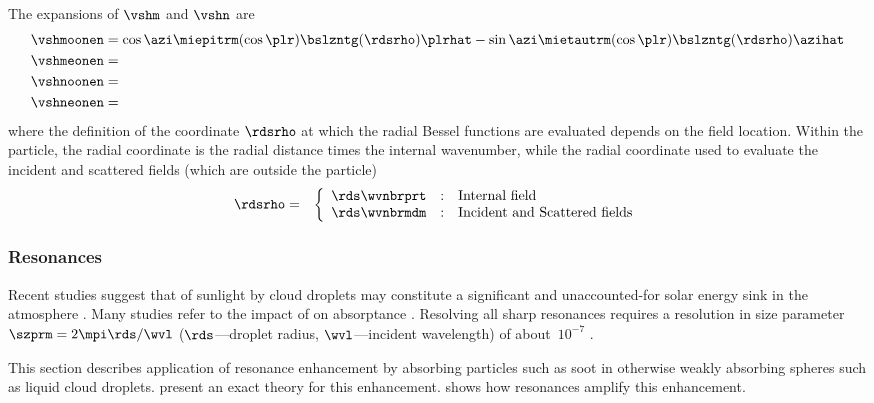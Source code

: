 \documentclass[12pt]{article}
\begin{document}
The  expansions of $\vshm$ and
$\vshn$ are
\begin{subequations}
\label{eqn:vsh_dfn}
\begin{align}
\label{eqn:vshmoonen_dfn}
\vshmoonen & = 
\cos \azi \miepitrm (\cos \plr) \bslzntg (\rdsrho) \plrhat -
\sin \azi \mietautrm (\cos \plr) \bslzntg (\rdsrho) \azihat \\
\label{eqn:vshmeonen_dfn}
\vshmeonen & = \\
\label{eqn:vshnoonen_dfn}
\vshnoonen & = \\
\label{eqn:vshneonen_dfn}
\vshneonen & =  
\end{align}
\end{subequations} 
where the definition of the coordinate $\rdsrho$ at which the radial
Bessel functions are evaluated depends on the field location.
Within the particle, the radial coordinate is the radial distance
times the internal wavenumber, while the radial coordinate used to
evaluate the incident and scattered fields (which are outside the
particle) 
\begin{eqnarray}
\rdsrho & = & \left\{
\begin{array}{l@{\quad:\quad}ll}
\rds \wvnbrprt & \mbox{Internal field} \\
\rds \wvnbrmdm & \mbox{Incident and Scattered fields}
\end{array} \right.
\label{eqn:rds_rho_dfn}
\end{eqnarray}

\subsubsection[Resonances]{Resonances}\label{sxn:rsn}
Recent studies suggest that  of sunlight
by cloud droplets may constitute a significant and unaccounted-for
solar energy sink in the atmosphere \cite[e.g,][]{Nus03}.
Many studies refer to the impact of  on absorptance 
\cite[e.g.,][]{CKK781,CKK782,BeR78,BoH83,GuN94,MaS99,Mit00,Mar02,Nus03,ZeT06}. 
Resolving all sharp resonances requires a resolution in size parameter 
$\szprm = 2\mpi\rds/\wvl$ ($\rds$---droplet radius, $\wvl$---incident
wavelength) of about~$10^{-7}$ \cite[][]{CKK781}.

This section describes application of resonance enhancement 
by absorbing particles such as soot in otherwise weakly absorbing
spheres such as liquid cloud droplets.
\cite{MaS99} present an exact theory for this enhancement.
\cite{Mar02} shows how resonances amplify this enhancement.
\end{document}
